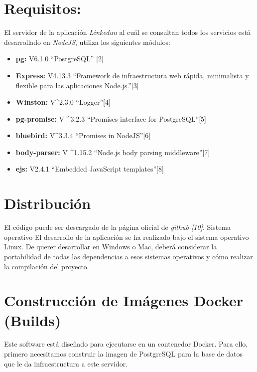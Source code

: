 \documentclass[a4paper,10pt,spanish]{sphinxmanual}
\begin{document}
\section{Requisitos:}
\label{sharedServer:requisitos}
El servidor de la aplicación \emph{Linkedun} al cuál se consultan todos los servicios está desarrollado en \emph{NodeJS}, utiliza los siguientes módulos:
\begin{itemize}
\item {} 
\textbf{pg:} V6.1.0 “PostgreSQL” {[}2{]}

\item {} 
\textbf{Express:} V4.13.3 “Framework de infraestructura web rápida, minimalista y flexible para las aplicaciones Node.js.”{[}3{]}

\item {} 
\textbf{Winston:} V\textasciicircum{}2.3.0 “Logger”{[}4{]}

\item {} 
\textbf{pg-promise:} V \textasciicircum{}3.2.3 “Promises interface for PostgreSQL”{[}5{]}

\item {} 
\textbf{bluebird:} V\textasciicircum{}3.3.4 “Promises in NodeJS”{[}6{]}

\item {} 
\textbf{body-parser:} V \textasciicircum{}1.15.2 “Node.js body parsing middleware”{[}7{]}

\item {} 
\textbf{ejs:} V2.4.1 “Embedded JavaScript templates”{[}8{]}

\end{itemize}


\section{Distribución}
\label{sharedServer:distribucion}
El código puede ser descargado de la página oficial de \emph{github {[}10{]}}.
Sistema operativo
El desarrollo de la aplicación se ha realizado bajo el sistema operativo Linux. De querer desarrollar en Windows o Mac, deberá considerar la portabilidad de todas las dependencias a esos sistemas operativos y cómo realizar la compilación del proyecto.


\section{Construcción de Imágenes Docker (Builds)}
\label{sharedServer:construccion-de-imagenes-docker-builds}
Este software está diseñado para ejecutarse en un contenedor Docker. Para ello, primero necesitamos construir la imagen de PostgreSQL para la base de datos que le da infraestructura a este servidor.
\end{document}

